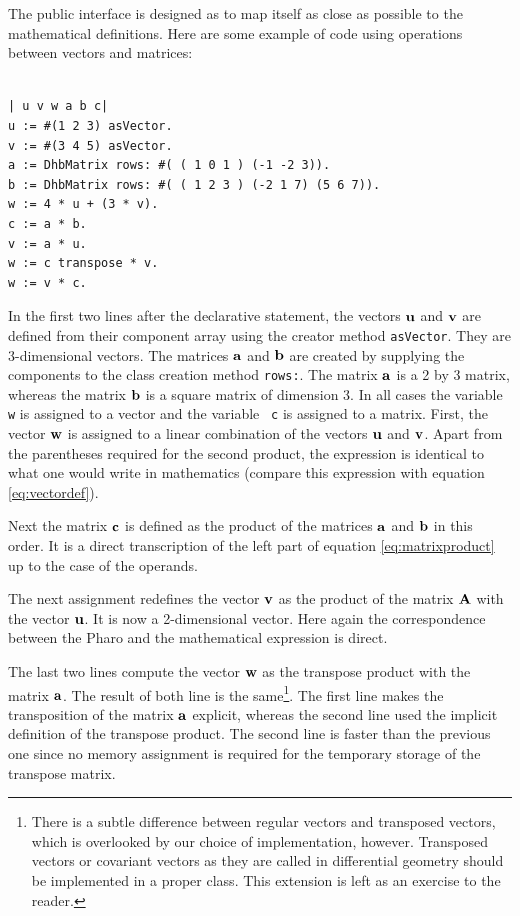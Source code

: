 \documentclass[twoside]{book}
\begin{document}
The public interface is designed as to map itself as close as
possible to the mathematical definitions. Here are some example of
code using operations between vectors and matrices:
\begin{codeExample}
\begin{verbatim}

| u v w a b c|
u := #(1 2 3) asVector.
v := #(3 4 5) asVector.
a := DhbMatrix rows: #( ( 1 0 1 ) (-1 -2 3)).
b := DhbMatrix rows: #( ( 1 2 3 ) (-2 1 7) (5 6 7)).
w := 4 * u + (3 * v).
c := a * b.
v := a * u.
w := c transpose * v.
w := v * c.
\end{verbatim}
\end{codeExample}
In the first two lines after the declarative statement, the
vectors ${\bf u}$ and ${\bf v}$ are defined from their component
array using the creator method {\tt asVector}. They are
3-dimensional vectors. The matrices ${\bf a}$ and ${\bf b}$ are
created by supplying the components to the class creation method
{\tt rows:}. The matrix ${\bf a}$ is a 2 by 3 matrix, whereas the
matrix ${\bf b}$ is a square matrix of dimension 3. In all cases
the variable {\tt w} is assigned to a vector and the variable {\tt
c} is assigned to a matrix. First, the vector ${\bf w}$ is
assigned to a linear combination of the vectors ${\bf u}$ and
${\bf v}$. Apart from the parentheses required for the second
product, the expression is identical to what one would write in
mathematics (compare this expression with equation
\ref{eq:vectordef}).

Next the matrix ${\bf c}$ is defined as the product of the
matrices ${\bf a}$ and ${\bf b}$ in this order. It is a direct
transcription of the left part of equation \ref{eq:matrixproduct}
up to the case of the operands.

The next assignment redefines the vector ${\bf v}$ as the product
of the matrix ${\bf A}$ with the vector ${\bf u}$. It is now a
2-dimensional vector. Here again the correspondence between the
Pharo and the mathematical expression is direct.

The last two lines compute the vector ${\bf w}$ as the transpose
product with the matrix ${\bf a}$. The result of both line is the
same\footnote{\label{ft:covariant}There is a subtle difference
between regular vectors and transposed vectors, which is
overlooked by our choice of implementation, however. Transposed
vectors or covariant vectors as they are called in differential
geometry should be implemented in a proper class. This extension
is left as an exercise to the reader.}. The first line makes the
transposition of the matrix ${\bf a}$ explicit, whereas the second
line used the implicit definition of the transpose product. The
second line is faster than the previous one since no memory
assignment is required for the temporary storage of the transpose
matrix.
\end{document}
